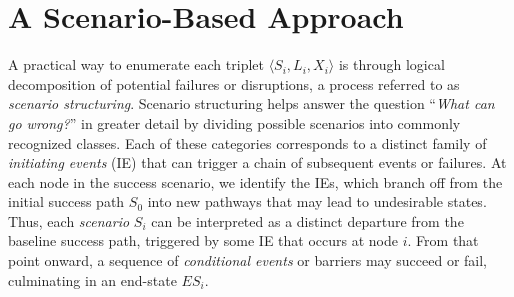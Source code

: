 \section{A Scenario-Based Approach}
\label{sec:scenario_approach_to_pra}

A practical way to enumerate each triplet \(\langle S_i, L_i, X_i\rangle\) is through logical decomposition of potential failures or disruptions, a process referred to as \emph{scenario structuring}. Scenario structuring helps answer the question ``\textit{What can go wrong?}'' in greater detail by dividing possible scenarios into commonly recognized classes. Each of these categories corresponds to a distinct family of \emph{initiating events} (IE) that can trigger a chain of subsequent events or failures. At each node in the success scenario, we identify the IEs, which branch off from the initial success path \(S_0\) into new pathways that may lead to undesirable states. Thus, each \emph{scenario} \(S_i\) can be interpreted as a distinct departure from the baseline success path, triggered by some IE that occurs at node \(i\). From that point onward, a sequence of \emph{conditional events} or barriers may succeed or fail, culminating in an end-state \(ES_i\).
